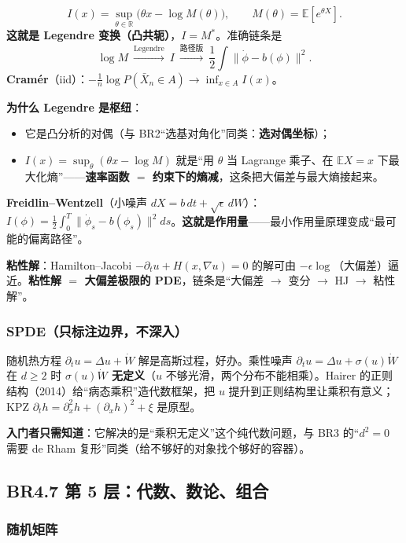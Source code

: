 \[
I(x)=\sup_{\theta\in\mathbb{R}}\big(\theta x-\log M(\theta)\big),\qquad M(\theta)=\mathbb{E}[e^{\theta X}].
\]
\textbf{这就是 Legendre 变换（凸共轭）}，$I=M^*$。准确链条是
\[
\log M\ \xrightarrow{\text{Legendre}}\ I\ \xrightarrow{\text{路径版}}\ 
\frac12\int\lVert\dot\phi-b(\phi)\rVert^2 .
\]
\textbf{Cramér}（iid）：$-\frac1n\log P(\bar X_n\in A)\to\inf_{x\in A}I(x)$。

\textbf{为什么 Legendre 是枢纽}：
\begin{itemize}
  \item 它是凸分析的对偶（与 BR2“选基对角化”同类：\textbf{选对偶坐标}）；
  \item $I(x)=\sup_\theta(\theta x-\log M)$ 就是“用 $\theta$ 当 Lagrange 乘子、在 $\mathbb{E}X=x$ 下最大化熵”——\textbf{速率函数 $=$ 约束下的熵减}，这条把大偏差与最大熵接起来。
\end{itemize}

\textbf{Freidlin--Wentzell}（小噪声 $dX=b\,dt+\sqrt\epsilon\,dW$）：$I(\phi)=\frac12\int_0^T\lVert\dot\phi_s-b(\phi_s)\rVert^2ds$。\textbf{这就是作用量}——最小作用量原理变成“最可能的偏离路径”。

\textbf{粘性解}：Hamilton--Jacobi $-\partial_tu+H(x,\nabla u)=0$ 的解可由 $-\epsilon\log$（大偏差）逼近。\textbf{粘性解 $=$ 大偏差极限的 PDE}，链条是“大偏差 $\to$ 变分 $\to$ HJ $\to$ 粘性解”。

\subsubsection{SPDE（只标注边界，不深入）}

随机热方程 $\partial_tu=\Delta u+\dot W$ 解是高斯过程，好办。乘性噪声 $\partial_tu=\Delta u+\sigma(u)\dot W$ 在 $d\ge2$ 时 \textbf{$\sigma(u)\dot W$ 无定义}（$u$ 不够光滑，两个分布不能相乘）。Hairer 的正则结构（2014）给“病态乘积”造代数框架，把 $u$ 提升到正则结构里让乘积有意义；KPZ $\partial_th=\partial_x^2h+(\partial_xh)^2+\xi$ 是原型。

\textbf{入门者只需知道}：它解决的是“乘积无定义”这个纯代数问题，与 BR3 的“$d^2=0$ 需要 de Rham 复形”同类（给不够好的对象找个够好的容器）。

\subsection{BR4.7 第 5 层：代数、数论、组合}

\subsubsection{随机矩阵}

